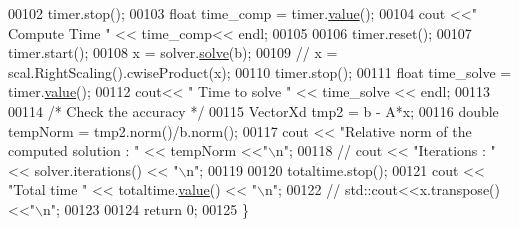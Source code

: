 \begin{DoxyCode}
00102   timer.stop(); 
00103   \textcolor{keywordtype}{float} time\_comp = timer.\hyperlink{class_eigen_1_1_bench_timer_a26760f963ed8b64c126159bfea57735e}{value}(); 
00104   cout <<\textcolor{stringliteral}{" Compute Time "} << time\_comp<< endl; 
00105   
00106   timer.reset();
00107   timer.start();
00108   x = solver.\hyperlink{group___sparse_core___module_a4a66e9498b06e3ec4ec36f06b26d4e8f}{solve}(b);
00109 \textcolor{comment}{//   x = scal.RightScaling().cwiseProduct(x);}
00110   timer.stop();
00111   \textcolor{keywordtype}{float} time\_solve = timer.\hyperlink{class_eigen_1_1_bench_timer_a26760f963ed8b64c126159bfea57735e}{value}(); 
00112   cout<< \textcolor{stringliteral}{" Time to solve "} << time\_solve << endl; 
00113  
00114   \textcolor{comment}{/* Check the accuracy */}
00115   VectorXd tmp2 = b - A*x;
00116   \textcolor{keywordtype}{double} tempNorm = tmp2.norm()/b.norm();
00117   cout << \textcolor{stringliteral}{"Relative norm of the computed solution : "} << tempNorm <<\textcolor{stringliteral}{"\(\backslash\)n"};
00118 \textcolor{comment}{//   cout << "Iterations : " << solver.iterations() << "\(\backslash\)n"; }
00119   
00120   totaltime.stop();
00121   cout << \textcolor{stringliteral}{"Total time "} << totaltime.\hyperlink{class_eigen_1_1_bench_timer_a26760f963ed8b64c126159bfea57735e}{value}() << \textcolor{stringliteral}{"\(\backslash\)n"};
00122 \textcolor{comment}{//  std::cout<<x.transpose()<<"\(\backslash\)n";}
00123   
00124   \textcolor{keywordflow}{return} 0;
00125 \}
\end{DoxyCode}

